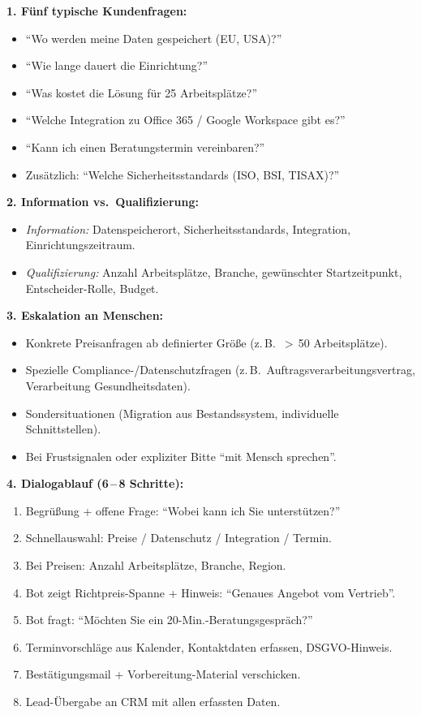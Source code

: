 \documentclass[11pt,a4paper,oneside]{article}
\begin{document}
\begin{loesungbox}
\textbf{1. Fünf typische Kundenfragen:}
\begin{itemize}
  \item ``Wo werden meine Daten gespeichert (EU, USA)?''
  \item ``Wie lange dauert die Einrichtung?''
  \item ``Was kostet die Lösung für 25 Arbeitsplätze?''
  \item ``Welche Integration zu Office 365 / Google Workspace gibt es?''
  \item ``Kann ich einen Beratungstermin vereinbaren?''
  \item Zusätzlich: ``Welche Sicherheitsstandards (ISO, BSI, TISAX)?''
\end{itemize}

\textbf{2. Information vs.\ Qualifizierung:}
\begin{itemize}
  \item \emph{Information:} Datenspeicherort, Sicherheitsstandards, Integration, Einrichtungszeitraum.
  \item \emph{Qualifizierung:} Anzahl Arbeitsplätze, Branche, gewünschter Startzeitpunkt, Entscheider-Rolle, Budget.
\end{itemize}

\textbf{3. Eskalation an Menschen:}
\begin{itemize}
  \item Konkrete Preisanfragen ab definierter Größe (z.\,B.\ $>$\,50 Arbeitsplätze).
  \item Spezielle Compliance-/Datenschutzfragen (z.\,B.\ Auftragsverarbeitungsvertrag, Verarbeitung Gesundheitsdaten).
  \item Sondersituationen (Migration aus Bestandssystem, individuelle Schnittstellen).
  \item Bei Frustsignalen oder expliziter Bitte ``mit Mensch sprechen''.
\end{itemize}

\textbf{4. Dialogablauf (6\,--\,8 Schritte):}
\begin{enumerate}
  \item Begrüßung + offene Frage: ``Wobei kann ich Sie unterstützen?''
  \item Schnellauswahl: Preise / Datenschutz / Integration / Termin.
  \item Bei Preisen: Anzahl Arbeitsplätze, Branche, Region.
  \item Bot zeigt Richtpreis-Spanne + Hinweis: ``Genaues Angebot vom Vertrieb''.
  \item Bot fragt: ``Möchten Sie ein 20-Min.-Beratungsgespräch?''
  \item Terminvorschläge aus Kalender, Kontaktdaten erfassen, DSGVO-Hinweis.
  \item Bestätigungsmail + Vorbereitung-Material verschicken.
  \item Lead-Übergabe an CRM mit allen erfassten Daten.
\end{enumerate}


\end{loesungbox}
\end{document}
